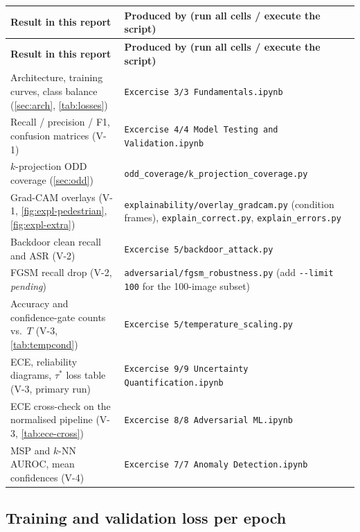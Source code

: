 \documentclass[a4paper,12pt]{article}
\begin{document}
{\footnotesize
\begin{longtable}{@{}P{4.6cm}P{10.4cm}@{}}
\toprule
\textbf{Result in this report} & \textbf{Produced by (run all cells / execute the script)} \\
\midrule
\endfirsthead
\toprule
\textbf{Result in this report} & \textbf{Produced by (run all cells / execute the script)} \\
\midrule
\endhead
\bottomrule
\endlastfoot
Architecture, training curves, class balance (\cref{sec:arch}, \cref{tab:losses})
  & \texttt{Excercise 3/3 Fundamentals.ipynb} \\
Recall / precision / F1, confusion matrices (V-1)
  & \texttt{Excercise 4/4 Model Testing and Validation.ipynb} \\
$k$-projection ODD coverage (\cref{sec:odd})
  & \texttt{odd\_coverage/k\_projection\_coverage.py} \\
Grad-CAM overlays (V-1, \cref{fig:expl-pedestrian}, \cref{fig:expl-extra})
  & \texttt{explainability/overlay\_gradcam.py} (condition frames),
    \texttt{explain\_correct.py}, \texttt{explain\_errors.py} \\
Backdoor clean recall and ASR (V-2)
  & \texttt{Excercise 5/backdoor\_attack.py} \\
FGSM recall drop (V-2, \emph{pending})
  & \texttt{adversarial/fgsm\_robustness.py} (add \texttt{-{}-limit 100} for the
    100-image subset) \\
Accuracy and confidence-gate counts vs.\ $T$ (V-3, \cref{tab:tempcond})
  & \texttt{Excercise 5/temperature\_scaling.py} \\
ECE, reliability diagrams, $\tau^{*}$ loss table (V-3, primary run)
  & \texttt{Excercise 9/9 Uncertainty Quantification.ipynb} \\
ECE cross-check on the normalised pipeline (V-3, \cref{tab:ece-cross})
  & \texttt{Excercise 8/8 Adversarial ML.ipynb} \\
MSP and $k$-NN AUROC, mean confidences (V-4)
  & \texttt{Excercise 7/7 Anomaly Detection.ipynb} \\
\end{longtable}}

\setcounter{table}{0}

\subsection{Training and validation loss per epoch}
\end{document}
